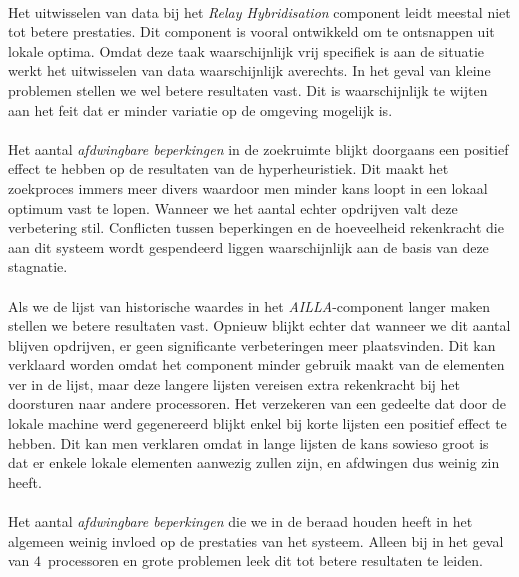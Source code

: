 \paragraph{}
Het uitwisselen van data bij het \emph{Relay Hybridisation} component leidt meestal niet tot betere prestaties. Dit component is vooral ontwikkeld om te ontsnappen uit lokale optima. Omdat deze taak waarschijnlijk vrij specifiek is aan de situatie werkt het uitwisselen van data waarschijnlijk averechts. In het geval van kleine problemen stellen we wel betere resultaten vast. Dit is waarschijnlijk te wijten aan het feit dat er minder variatie op de omgeving mogelijk is.

\paragraph{}
Het aantal \emph{afdwingbare beperkingen} in de zoekruimte blijkt doorgaans een positief effect te hebben op de resultaten van de hyperheuristiek. Dit maakt het zoekproces immers meer divers waardoor men minder kans loopt in een lokaal optimum vast te lopen. Wanneer we het aantal echter opdrijven valt deze verbetering stil. Conflicten tussen beperkingen en de hoeveelheid rekenkracht die aan dit systeem wordt gespendeerd liggen waarschijnlijk aan de basis van deze stagnatie.

\paragraph{}
Als we de lijst van historische waardes in het \emph{AILLA}-component langer maken stellen we betere resultaten vast. Opnieuw blijkt echter dat wanneer we dit aantal blijven opdrijven, er geen significante verbeteringen meer plaatsvinden. Dit kan verklaard worden omdat het component minder gebruik maakt van de elementen ver in de lijst, maar deze langere lijsten vereisen extra rekenkracht bij het doorsturen naar andere processoren. Het verzekeren van een gedeelte dat door de lokale machine werd gegenereerd blijkt enkel bij korte lijsten een positief effect te hebben. Dit kan men verklaren omdat in lange lijsten de kans sowieso groot is dat er enkele lokale elementen aanwezig zullen zijn, en afdwingen dus weinig zin heeft.

\paragraph{}
Het aantal \emph{afdwingbare beperkingen} die we in de beraad houden heeft in het algemeen weinig invloed op de prestaties van het systeem. Alleen bij in het geval van $4$~processoren en grote problemen leek dit tot betere resultaten te leiden.

